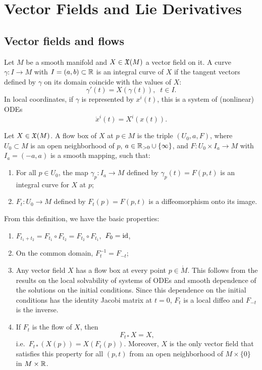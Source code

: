 \newpage
\section{Vector Fields and Lie Derivatives}


\subsection{Vector fields and flows}


\begin{defn}
Let $M$ be a smooth manifold and $X\in\mathfrak{X}(M)$ a vector field on it. A curve $\gamma:I\to M$ with $I=(a,b)\subset\mathbb{R} $ is an integral curve of $X$ if the tangent vectors defined by $\gamma$ on its domain coincide with the values of $X$: 
\[
\gamma'(t)=X(\gamma(t)),\;\;t\in I.
\]
In local coordinates, if $\gamma$ is represented by $x^i(t)$, this is a system of (nonlinear) ODEs
\[
\dot x^i(t)=X^i(x(t)).
\]
\end{defn}
\begin{defn}
Let $X\in\mathfrak{X}(M)$. A flow box of $X$ at $p\in M$ is the triple $(U_0,a,F)$, where $U_0\subset M$ is an open neighborhood of $p$, $a\in \mathbb{R}_{>0}\cup\{\infty\}$, and $F:U_0\times I_a\to M$ with $I_a=(-a,a)$ is a smooth mapping, such that:
\begin{enumerate}
    \item For all $p\in U_0$, the map $\gamma_p:I_a\to M$ defined by $\gamma_p(t)=F(p,t)$ is an integral curve for $X$ at $p$;
    \item $F_t:U_0\to M$ defined by $F_t(p)=F(p,t)$ is a diffeomorphism onto its image.
\end{enumerate}
\end{defn}
From this definition, we have the basic properties:
\begin{enumerate}
    \item $F_{t_1+t_2}=F_{t_1}\circ F_{t_2}=F_{t_2}\circ F_{t_1},$ $F_0=\operatorname{id}$,
    \item On the common domain, $F_t^{-1}=F_{-t}$;
    \item Any vector field $X$ has a flow box at every point $p\in \mathring{M}$. This follows from the results on the local solvability of systems of ODEs and smooth dependence of the solutions on the initial conditions. Since this dependence on the initial conditions has the identity Jacobi matrix at $t=0$, $F_t$ is a local diffeo and $F_{-t}$ is the inverse.
    \item If $F_t$ is the flow of $X$, then \[F_{t\ast}X=X,\] i.e.\ $F_{t\ast}(X(p))=X(F_t(p))$. Moreover, $X$ is the only vector field that satisfies this property for all $(p,t)$ from an open neighborhood of $M\times\{0\}$ in $M\times\mathbb{R} $.
\end{enumerate}

